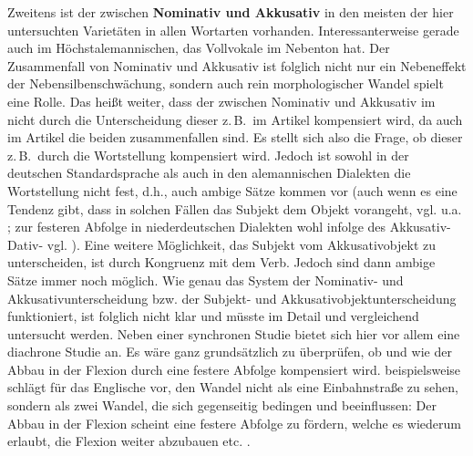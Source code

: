 Zweitens ist der  zwischen \textbf{Nominativ und Akkusativ} in den meisten der hier untersuchten Varietäten in allen Wortarten vorhanden. Interessanterweise gerade auch im Höchstalemannischen, das Vollvokale im Nebenton hat. Der Zusammenfall von Nominativ und Akkusativ ist folglich nicht nur ein Nebeneffekt der Nebensilbenschwächung, sondern auch rein morphologischer Wandel spielt eine Rolle. Das heißt weiter, dass der  zwischen Nominativ und Akkusativ im  nicht durch die Unterscheidung dieser  z.\,B.\ im Artikel kompensiert wird, da auch im Artikel die beiden  zusammenfallen sind. Es stellt sich also die Frage, ob dieser  z.\,B.\ durch die Wortstellung kompensiert wird. Jedoch ist sowohl in der deutschen Standardsprache als auch in den alemannischen Dialekten die Wortstellung nicht fest, d.h., auch ambige Sätze kommen vor (auch wenn es eine Tendenz gibt, dass in solchen Fällen das Subjekt dem Objekt vorangeht, vgl. u.a. \citealt{Ellsäßer2015}; zur festeren Abfolge in niederdeutschen Dialekten wohl infolge des Akkusativ-Dativ- vgl. \citealt[320-321]{Berg2013}). Eine weitere Möglichkeit, das Subjekt vom Akkusativobjekt zu unterscheiden, ist durch Kongruenz mit dem Verb. Jedoch sind dann ambige Sätze immer noch möglich. Wie genau das System der Nominativ- und Akkusativunterscheidung bzw. der Subjekt- und Akkusativobjektunterscheidung funktioniert, ist folglich nicht klar und müsste im Detail und vergleichend untersucht werden. Neben einer synchronen Studie bietet sich hier vor allem eine diachrone Studie an. Es wäre ganz grundsätzlich zu überprüfen, ob und wie der Abbau in der Flexion durch eine festere Abfolge kompensiert wird. \citet{Allen2006} beispielsweise schlägt für das Englische vor, den Wandel nicht als eine Einbahnstraße zu sehen, sondern als zwei Wandel, die sich gegenseitig bedingen und beeinflussen: Der Abbau in der Flexion scheint eine festere Abfolge zu fördern, welche es wiederum erlaubt, die Flexion weiter abzubauen etc. \citep[209-216]{Allen2006}.

